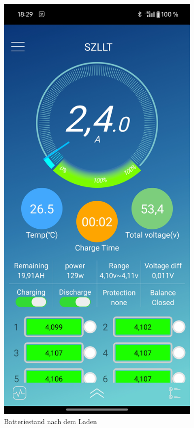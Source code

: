 \begin{figure}[h]
    \centering
    \includegraphics[width=10cm]{images/Batterienachdemladen}
    \caption{Batteriestand nach dem Laden\cite{lorenz_scherrer_selbst_2023}}
    \label{fig:37}
\end{figure}




